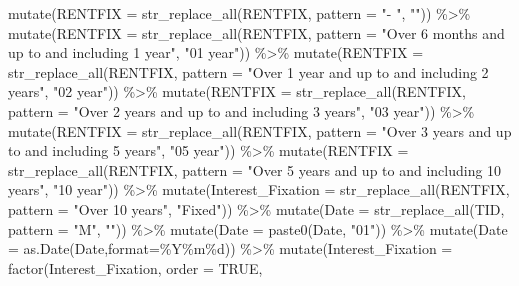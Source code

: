 \documentclass[
]{book}
\newenvironment{Shaded}{\begin{snugshade}}{\end{snugshade}}
\newcommand{\AttributeTok}[1]{\textcolor[rgb]{0.77,0.63,0.00}{#1}}
\newcommand{\ConstantTok}[1]{\textcolor[rgb]{0.00,0.00,0.00}{#1}}
\newcommand{\FunctionTok}[1]{\textcolor[rgb]{0.00,0.00,0.00}{#1}}
\newcommand{\NormalTok}[1]{#1}
\newcommand{\SpecialCharTok}[1]{\textcolor[rgb]{0.00,0.00,0.00}{#1}}
\newcommand{\StringTok}[1]{\textcolor[rgb]{0.31,0.60,0.02}{#1}}
\begin{document}
\begin{Shaded}
\begin{Highlighting}[]
    \FunctionTok{mutate}\NormalTok{(}\AttributeTok{RENTFIX =} \FunctionTok{str\_replace\_all}\NormalTok{(RENTFIX, }\AttributeTok{pattern =} \StringTok{"{-} "}\NormalTok{, }\StringTok{""}\NormalTok{)) }\SpecialCharTok{\%\textgreater{}\%}
    \FunctionTok{mutate}\NormalTok{(}\AttributeTok{RENTFIX =} \FunctionTok{str\_replace\_all}\NormalTok{(RENTFIX, }\AttributeTok{pattern =} \StringTok{"Over 6 months and up to and including 1 year"}\NormalTok{, }\StringTok{"01 year"}\NormalTok{)) }\SpecialCharTok{\%\textgreater{}\%}
    \FunctionTok{mutate}\NormalTok{(}\AttributeTok{RENTFIX =} \FunctionTok{str\_replace\_all}\NormalTok{(RENTFIX, }\AttributeTok{pattern =} \StringTok{"Over 1 year and up to and including 2 years"}\NormalTok{, }\StringTok{"02 year"}\NormalTok{)) }\SpecialCharTok{\%\textgreater{}\%}
    \FunctionTok{mutate}\NormalTok{(}\AttributeTok{RENTFIX =} \FunctionTok{str\_replace\_all}\NormalTok{(RENTFIX, }\AttributeTok{pattern =} \StringTok{"Over 2 years and up to and including 3 years"}\NormalTok{, }\StringTok{"03 year"}\NormalTok{)) }\SpecialCharTok{\%\textgreater{}\%}
    \FunctionTok{mutate}\NormalTok{(}\AttributeTok{RENTFIX =} \FunctionTok{str\_replace\_all}\NormalTok{(RENTFIX, }\AttributeTok{pattern =} \StringTok{"Over 3 years and up to and including 5 years"}\NormalTok{, }\StringTok{"05 year"}\NormalTok{)) }\SpecialCharTok{\%\textgreater{}\%}
    \FunctionTok{mutate}\NormalTok{(}\AttributeTok{RENTFIX =} \FunctionTok{str\_replace\_all}\NormalTok{(RENTFIX, }\AttributeTok{pattern =} \StringTok{"Over 5 years and up to and including 10 years"}\NormalTok{, }\StringTok{"10 year"}\NormalTok{)) }\SpecialCharTok{\%\textgreater{}\%}
    \FunctionTok{mutate}\NormalTok{(}\AttributeTok{Interest\_Fixation =} \FunctionTok{str\_replace\_all}\NormalTok{(RENTFIX, }\AttributeTok{pattern =} \StringTok{"Over 10 years"}\NormalTok{, }\StringTok{"Fixed"}\NormalTok{)) }\SpecialCharTok{\%\textgreater{}\%}
    \FunctionTok{mutate}\NormalTok{(}\AttributeTok{Date =} \FunctionTok{str\_replace\_all}\NormalTok{(TID, }\AttributeTok{pattern =} \StringTok{"M"}\NormalTok{, }\StringTok{""}\NormalTok{)) }\SpecialCharTok{\%\textgreater{}\%}
    \FunctionTok{mutate}\NormalTok{(}\AttributeTok{Date =} \FunctionTok{paste0}\NormalTok{(Date, }\StringTok{"01"}\NormalTok{)) }\SpecialCharTok{\%\textgreater{}\%}
    \FunctionTok{mutate}\NormalTok{(}\AttributeTok{Date =} \FunctionTok{as.Date}\NormalTok{(Date,}\AttributeTok{format=}\StringTok{\textquotesingle{}\%Y\%m\%d\textquotesingle{}}\NormalTok{))  }\SpecialCharTok{\%\textgreater{}\%}
    \FunctionTok{mutate}\NormalTok{(}\AttributeTok{Interest\_Fixation =} \FunctionTok{factor}\NormalTok{(Interest\_Fixation, }\AttributeTok{order =} \ConstantTok{TRUE}\NormalTok{, }

\end{Highlighting}
\end{Shaded}
\end{document}
